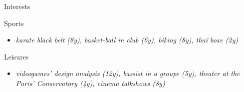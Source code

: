 \vspace{4mm}
\hspace*{-2mm}
{\fontsize{16}{10}\selectfont \hspace{1.5mm} Interests}
\newline \newline

\vspace{-8mm}
\hspace{-2mm}
{\fontsize{12}{10}\selectfont \hspace{3.8mm} Sports}\newline
\vspace{-6mm}
\begin{itemize}
    \item[\tiny\ding{110}] \textit{karate black belt (8y), basket-ball in club (6y), biking (8y), thaï boxe (2y)}
\end{itemize}

\hspace{-2mm}
\vspace{-6mm}
{\fontsize{12}{10}\selectfont \hspace{3.8mm} Leisures}\newline
\begin{itemize}
    \item[\tiny\ding{110}] \textit{videogames' design analysis (12y), bassist in a groupe (5y), theater at the Paris' Conservatory (4y), cinema talkshows (8y)}
\end{itemize}
\vspace{2mm}
